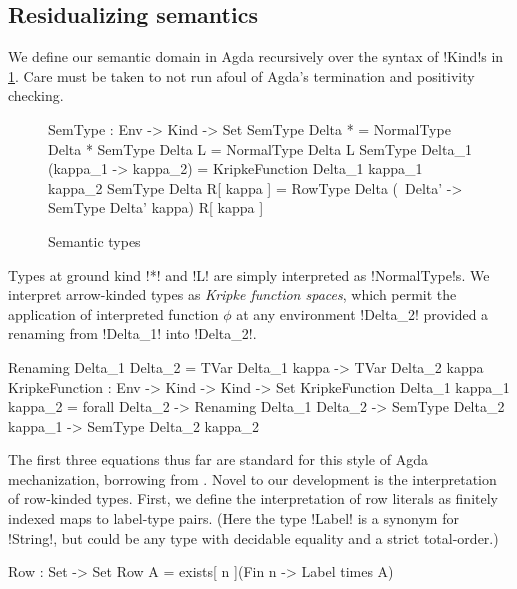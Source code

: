 \documentclass[sigplan,10pt,review]{acmart}\settopmatter{printfolios=true,printccs=false,printacmref=false}
\begin{document}
\subsection{Residualizing semantics}

We define our semantic domain in Agda recursively over the syntax of !Kind!s in \cref{fig:SemType}. Care must be taken to not run afoul of Agda's termination and positivity checking.

\begin{figure}
\begin{agda}
SemType : Env -> Kind -> Set
SemType Delta * = NormalType Delta *
SemType Delta L = NormalType Delta L 
SemType Delta_1 (kappa_1 -> kappa_2) = KripkeFunction Delta_1  kappa_1  kappa_2 
SemType Delta R[ kappa ] = 
  RowType Delta (\ Delta' -> SemType Delta' kappa) R[ kappa ]
\end{agda}
\caption{Semantic types}
\label{fig:SemType}
\end{figure}

Types at ground kind !*! and !L! are simply interpreted as !NormalType!s. We interpret arrow-kinded types as \emph{Kripke function spaces}, which permit the application of interpreted function $\phi$ at any environment !Delta_2! provided a renaming from !Delta_1! into !Delta_2!. %

\begin{agda}
Renaming Delta_1  Delta_2 = TVar Delta_1 kappa -> TVar Delta_2 kappa
KripkeFunction : Env -> Kind -> Kind -> Set
KripkeFunction Delta_1  kappa_1  kappa_2 =  forall {Delta_2} -> 
  Renaming Delta_1  Delta_2 -> SemType Delta_2  kappa_1 -> SemType Delta_2  kappa_2
\end{agda}

The first three equations thus far are standard for this style of Agda mechanization, borrowing from \citet{ChapmanKNW19}. Novel to our development is the interpretation of row-kinded types. First, we define the interpretation of row literals as finitely indexed maps to label-type pairs. (Here the type !Label! is a synonym for !String!, but could be any type with decidable equality and a strict total-order.)

\begin{agda} 
Row : Set -> Set
Row A = exists[ n ](Fin n -> Label times A)
\end{agda}
\end{document}
